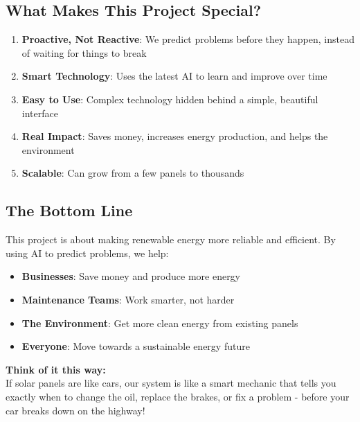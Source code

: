 \documentclass[12pt,a4paper]{article}
\begin{document}
\subsection{What Makes This Project Special?}

\begin{enumerate}[leftmargin=*]
    \item \textbf{Proactive, Not Reactive}: We predict problems before they happen, instead of waiting for things to break
    
    \item \textbf{Smart Technology}: Uses the latest AI to learn and improve over time
    
    \item \textbf{Easy to Use}: Complex technology hidden behind a simple, beautiful interface
    
    \item \textbf{Real Impact}: Saves money, increases energy production, and helps the environment
    
    \item \textbf{Scalable}: Can grow from a few panels to thousands
\end{enumerate}

\subsection{The Bottom Line}

This project is about making renewable energy more reliable and efficient. By using AI to predict problems, we help:

\begin{itemize}[leftmargin=*]
    \item \textbf{Businesses}: Save money and produce more energy
    \item \textbf{Maintenance Teams}: Work smarter, not harder
    \item \textbf{The Environment}: Get more clean energy from existing panels
    \item \textbf{Everyone}: Move towards a sustainable energy future
\end{itemize}

\vspace{1cm}

\begin{center}
\begin{tcolorbox}[colback=easyblue!10!white,colframe=easyblue!75!black,width=0.9\textwidth]
\large\centering
\textbf{Think of it this way:}\\[0.5cm]
If solar panels are like cars, our system is like a smart mechanic that tells you exactly when to change the oil, replace the brakes, or fix a problem - before your car breaks down on the highway!
\end{tcolorbox}
\end{center}
\end{document}
